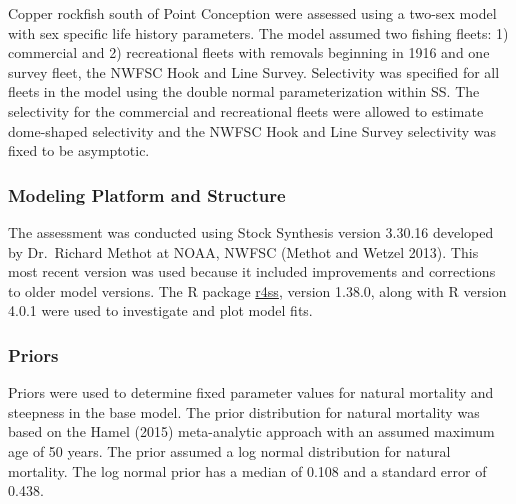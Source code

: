 \documentclass[11pt,
  english,
  a4paper,
]{article}
\begin{document}
Copper rockfish south of Point Conception were assessed using a two-sex model with sex specific life history parameters. The model assumed two fishing fleets: 1) commercial and 2) recreational fleets with removals beginning in 1916 and one survey fleet, the NWFSC Hook and Line Survey. Selectivity was specified for all fleets in the model using the double normal parameterization within SS. The selectivity for the commercial and recreational fleets were allowed to estimate dome-shaped selectivity and the NWFSC Hook and Line Survey selectivity was fixed to be asymptotic.

\leavevmode\tagmcend\tagstructend\par


\hypertarget{modeling-platform-and-structure}{%
\subsubsection{Modeling Platform and Structure}\label{modeling-platform-and-structure}}

\leavevmode\tagmcend\tagstructend


The assessment was conducted using Stock Synthesis version 3.30.16 developed by Dr.~Richard Methot at NOAA, NWFSC {(Methot and Wetzel 2013)\leavevmode\tagmcend\tagstructend}. This most recent version was used because it included improvements and corrections to older model versions. The R package {\href{https://github.com/r4ss/r4ss}{r4ss}\leavevmode\tagmcend\tagstructend}, version 1.38.0, along with R version 4.0.1 were used to investigate and plot model fits.

\leavevmode\tagmcend\tagstructend\par


\hypertarget{priors}{%
\subsubsection{Priors}\label{priors}}

\leavevmode\tagmcend\tagstructend


Priors were used to determine fixed parameter values for natural mortality and steepness in the base model. The prior distribution for natural mortality was based on the Hamel {(2015)\leavevmode\tagmcend\tagstructend} meta-analytic approach with an assumed maximum age of 50 years. The prior assumed a log normal distribution for natural mortality. The log normal prior has a median of 0.108 and a standard error of 0.438.
\end{document}
